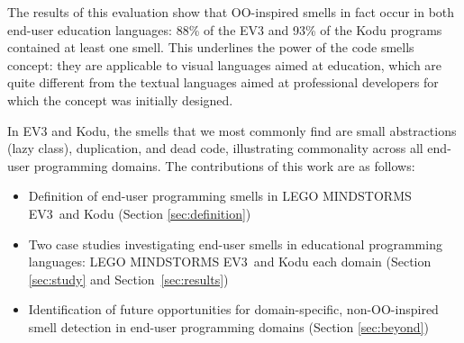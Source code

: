 \documentclass[conference]{IEEEtran}
\newcommand{\ms}{LEGO MINDSTORMS EV3}
\newcommand{\todo}[1]{\textbf{#1}}
\begin{document}
The results of this evaluation show that OO-inspired smells in fact occur in both end-user education languages: 88\% of the EV3 and 93\% of the Kodu programs contained at least one smell. This underlines the power of the code smells concept: they are applicable to visual languages aimed at education, which are quite different from the textual languages aimed at professional developers for which the concept was initially designed. 

In EV3 and Kodu, the smells that we most commonly find are small abstractions (lazy class), duplication, and dead code, illustrating commonality across all end-user programming domains. The contributions of this work are as follows:

\begin{itemize} \itemsep -0.25pt
	\item Definition of end-user programming smells in \ms~and Kodu  (Section \ref{sec:definition})
	\item Two case studies investigating end-user smells in educational programming languages: \ms~and Kodu each domain  (Section \ref{sec:study} and Section~\ref{sec:results})
	\item Identification of future opportunities for domain-specific, non-OO-inspired smell detection in end-user programming domains (Section \ref {sec:beyond})
\end{itemize}


\end{document}
